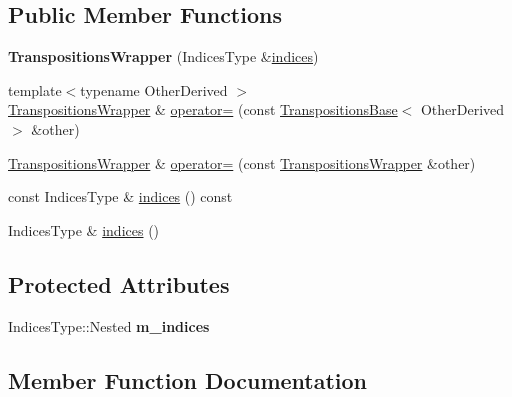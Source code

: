 \subsection*{Public Member Functions}
\begin{DoxyCompactItemize}
\item 
\mbox{\label{class_eigen_1_1_transpositions_wrapper_a61f69c978853a6a3979180cb1f83032c}} 
{\bfseries Transpositions\+Wrapper} (Indices\+Type \&\mbox{\hyperlink{class_eigen_1_1_transpositions_wrapper_a5a64081fa7eaa0b02ec10c548505899d}{indices}})
\item 
{\footnotesize template$<$typename Other\+Derived $>$ }\\\mbox{\hyperlink{class_eigen_1_1_transpositions_wrapper}{Transpositions\+Wrapper}} \& \mbox{\hyperlink{class_eigen_1_1_transpositions_wrapper_ac4e1956279759cbda2c9f2784197cfe9}{operator=}} (const \mbox{\hyperlink{class_eigen_1_1_transpositions_base}{Transpositions\+Base}}$<$ Other\+Derived $>$ \&other)
\item 
\mbox{\hyperlink{class_eigen_1_1_transpositions_wrapper}{Transpositions\+Wrapper}} \& \mbox{\hyperlink{class_eigen_1_1_transpositions_wrapper_acb74132efbe10876525cdc3d35c2d382}{operator=}} (const \mbox{\hyperlink{class_eigen_1_1_transpositions_wrapper}{Transpositions\+Wrapper}} \&other)
\item 
const Indices\+Type \& \mbox{\hyperlink{class_eigen_1_1_transpositions_wrapper_a5a64081fa7eaa0b02ec10c548505899d}{indices}} () const
\item 
Indices\+Type \& \mbox{\hyperlink{class_eigen_1_1_transpositions_wrapper_aab0aee4242436a7223fea797a1fa8ee9}{indices}} ()
\end{DoxyCompactItemize}
\subsection*{Protected Attributes}
\begin{DoxyCompactItemize}
\item 
\mbox{\label{class_eigen_1_1_transpositions_wrapper_af6b3c86af896c289a95e6dc1dd0c7706}} 
Indices\+Type\+::\+Nested {\bfseries m\+\_\+indices}
\end{DoxyCompactItemize}


\subsection{Member Function Documentation}
\mbox{\label{class_eigen_1_1_transpositions_wrapper_a5a64081fa7eaa0b02ec10c548505899d}} 
